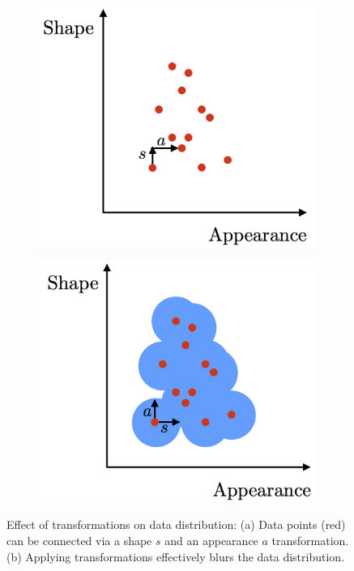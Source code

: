 		\begin{figure}[htp]
			\begin{subfigure}{0.40\linewidth}
				\centering
				\includegraphics[trim={0cm 0cm 0cm 0cm},clip, width=1.\linewidth]{fig/other/trans}
				\caption{}
			\end{subfigure}
			\begin{subfigure}{0.40\linewidth}
				\centering
				\includegraphics[trim={0cm 0cm 0cm 0cm},clip, width=1.\linewidth]{fig/other/trans2}
				\caption{}
			\end{subfigure}
			\caption{Effect of transformations on data distribution: (a) Data points (red) can be connected via a shape $s$ and an appearance $a$ transformation. (b) Applying transformations effectively blurs the data distribution.}
			\label{fig:trans}
		\end{figure}

